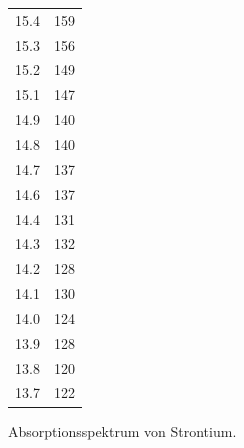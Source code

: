 \begin{figure}
{\begin{tabular}{c c}
    15.4 & 159 \\
    15.3 & 156 \\
    15.2 & 149 \\
    15.1 & 147 \\
    14.9 & 140 \\
    14.8 & 140 \\
    14.7 & 137 \\
    14.6 & 137 \\
    14.4 & 131 \\
    14.3 & 132 \\
    14.2 & 128 \\
    14.1 & 130 \\
    14.0 & 124 \\
    13.9 & 128 \\
    13.8 & 120 \\
    13.7 & 122 \\
    \bottomrule
  \end{tabular}
  }
  \caption{Absorptionsspektrum von Strontium.}
  \label{fig:5}
\end{figure}

